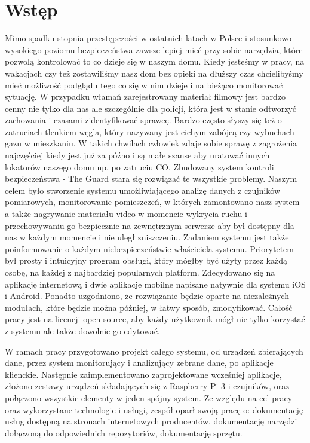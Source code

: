 \chapter{Wstęp}
Mimo spadku stopnia przestępczości w ostatnich latach w Polsce i stosunkowo wysokiego poziomu bezpieczeństwa zawsze lepiej mieć przy sobie narzędzia, które pozwolą kontrolować to co dzieje się w naszym domu. Kiedy jesteśmy w pracy, na wakacjach czy też zostawiliśmy nasz dom bez opieki na dłuższy czas chcielibyśmy mieć możliwość podglądu tego co się w nim dzieje i na bieżąco monitorować sytuację. W przypadku włamań zarejestrowany materiał filmowy jest bardzo cenny nie tylko dla nas ale szczególnie dla policji, która jest w stanie odtworzyć zachowania i czasami zidentyfikować sprawcę.  Bardzo często słyszy się też o zatruciach tlenkiem węgla, który nazywany jest cichym zabójcą czy wybuchach gazu w mieszkaniu. W takich chwilach człowiek zdaje sobie sprawę z zagrożenia najczęściej kiedy jest już za późno i są małe szanse aby uratować innych lokatorów naszego domu np. po zatruciu CO. 
Zbudowany system kontroli bezpieczeństwa - The Guard stara się rozwiązać te wszystkie problemy. Naszym celem było stworzenie systemu umożliwiającego analizę danych z czujników pomiarowych, monitorowanie pomieszczeń, w których zamontowano nasz system a także nagrywanie materiału video w momencie wykrycia ruchu i przechowywaniu go bezpiecznie na zewnętrznym serwerze aby był dostępny dla nas w każdym momencie i nie uległ zniszczeniu. Zadaniem systemu jest także poinformowanie o każdym niebezpieczeństwie właściciela systemu. Priorytetem był prosty i intuicyjny program obsługi, który mógłby być użyty przez każdą osobę, na każdej z najbardziej popularnych platform. Zdecydowano się na aplikację internetową i dwie aplikacje mobilne napisane natywnie dla systemu iOS i Android. Ponadto uzgodniono, że rozwiązanie będzie oparte na niezależnych modułach, które będzie można później, w łatwy sposób, zmodyfikować. Całość pracy jest na licencji open-source, aby każdy użytkownik mógł nie tylko korzystać z systemu ale także dowolnie go edytować.

W ramach pracy przygotowano projekt całego systemu, od urządzeń zbierających dane, przez system monitorujący i analizujący zebrane dane, po aplikacje klienckie. Następnie zaimplementowano zaprojektowane wcześniej aplikacje, złożono zestawy urządzeń składających się z Raspberry Pi 3 i czujników, oraz połączono wszystkie elementy w jeden spójny system.
Ze względu na cel pracy oraz wykorzystane technologie i usługi, zespół oparł swoją pracę o: dokumentację usług dostępną na stronach internetowych producentów, dokumentację narzędzi dołączoną do odpowiednich repozytoriów, dokumentację sprzętu.

